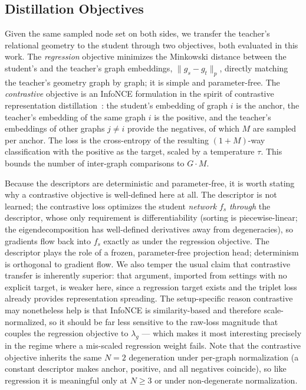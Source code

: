 \documentclass[11pt,letterpaper]{article}
\begin{document}
\subsection{Distillation Objectives}
\label{sec:objectives}

Given the same sampled node set on both sides, we transfer the teacher's relational
geometry to the student through two objectives, both evaluated in this work. The \emph{regression}
objective minimizes the Minkowski distance between the student's and the teacher's
graph embeddings, $\lVert g_s - g_t \rVert_p$, directly matching the teacher's geometry
graph by graph; it is simple and parameter-free. The \emph{contrastive} objective is
an InfoNCE formulation in the spirit of contrastive representation
distillation~\cite{tian2020crd}: the student's embedding of graph $i$ is the anchor,
the teacher's embedding of the same graph $i$ is the positive, and the teacher's
embeddings of other graphs $j \neq i$ provide the negatives, of which $M$ are sampled
per anchor. The loss is the cross-entropy of the resulting $(1{+}M)$-way classification
with the positive as the target, scaled by a temperature $\tau$. This bounds the number
of inter-graph comparisons to $G \cdot M$.

Because the descriptors are deterministic and parameter-free, it is worth stating why a
contrastive objective is well-defined here at all. The descriptor is not learned; the
contrastive loss optimizes the student \emph{network} $f_s$ \emph{through} the
descriptor, whose only requirement is differentiability (sorting is piecewise-linear;
the eigendecomposition has well-defined derivatives away from degeneracies), so gradients
flow back into $f_s$ exactly as under the regression objective. The descriptor plays the
role of a frozen, parameter-free projection head; determinism is orthogonal to gradient
flow. We also temper the usual claim that contrastive transfer is inherently superior:
that argument, imported from settings with no explicit target, is weaker here, since a
regression target exists and the triplet loss already provides representation spreading.
The setup-specific reason contrastive may nonetheless help is that InfoNCE is
similarity-based and therefore scale-normalized, so it should be far less sensitive to
the raw-loss magnitude that couples the regression objective to $\lambda_g$ --- which
makes it most interesting precisely in the regime where a mis-scaled regression weight
fails. Note that the contrastive objective inherits the same $N=2$ degeneration under
per-graph normalization (a constant descriptor makes anchor, positive, and all negatives
coincide), so like regression it is meaningful only at $N \geq 3$ or under
non-degenerate normalization.
\end{document}
